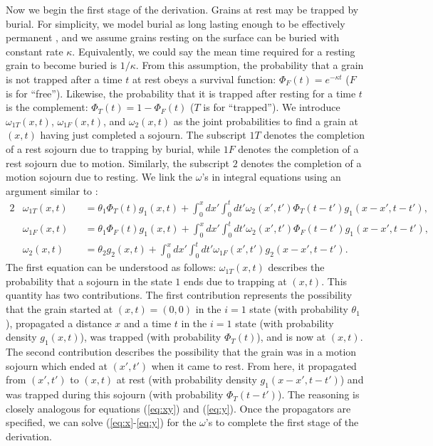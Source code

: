\documentclass[draft,grl]{agujournal2018}
\newcommand\om{\omega}
\begin{document}
Now we begin the first stage of the derivation.
Grains at rest may be trapped by burial.
For simplicity, we model burial as long lasting enough to be effectively permanent \citep[e.g.,][]{Wu2019}, and we assume grains resting on the surface can be buried with constant rate $\kappa$.
Equivalently, we could say the mean time required for a resting grain to become buried is $1/\kappa$.
From this assumption, the probability that a grain is not trapped after a time $t$ at rest obeys a survival function: $\Phi_F(t) = e^{-\kappa t}$ ($F$ is for ``free''). Likewise, the probability that it is trapped after resting for a time $t$ is the complement: $\Phi_T(t) = 1-\Phi_F(t)$ ($T$ is for ``trapped'').
We introduce $\omega_{1T}(x,t)$, $\omega_{1F}(x,t)$, and $\omega_2(x,t)$ as the joint probabilities to find a grain at $(x,t)$ having just completed a sojourn.
The subscript ${1T}$ denotes the completion of a rest sojourn due to trapping by burial, while $1F$ denotes the completion of a rest sojourn due to motion.
Similarly, the subscript $2$ denotes the completion of a motion sojourn due to resting.
We link the $\omega$'s in integral equations using an argument similar to \citet{Weiss1994}:
\begin{alignat}{2}
&\om_{1T}(x,t) &&= \theta_1\Phi_T(t)g_1(x,t) + \int_0^x dx' \int_0^t dt' \om_2(x',t')\Phi_T(t-t')g_1(x-x',t-t')\label{eq:x},\\
&\om_{1F}(x,t) &&= \theta_1\Phi_F(t)g_1(x,t) + \int_0^x dx' \int_0^t dt' \om_2(x',t') \Phi_F(t-t') g_1(x-x',t-t'),\label{eq:xy}\\
&\om_2(x,t) &&= \theta_2 g_2(x,t) + \int_0^x dx' \int_0^t dt' \om_{1F}(x',t')g_2(x-x',t-t'). \label{eq:y}
\end{alignat}
The first equation can be understood as follows: $\omega_{1T}(x,t)$ describes the probability that a sojourn in the state $1$ ends due to trapping at $(x,t)$. This quantity has two contributions. The first contribution represents the possibility that the grain started at $(x,t)=(0,0)$ in the $i=1$ state (with probability $\theta_1$), propagated a distance $x$ and a time $t$ in the $i=1$ state (with probability density $g_1(x,t)$), was trapped (with probability $\Phi_T(t)$), and is now at $(x,t)$. 
The second contribution describes the possibility that the grain was in a motion sojourn which ended at $(x',t')$ when it came to rest. From here, it propagated from $(x',t')$ to $(x,t)$ at rest (with probability density $g_1(x-x',t-t')$) and was trapped during this sojourn (with probability $\Phi_T(t-t')$).
The reasoning is closely analogous for equations (\ref{eq:xy}) and (\ref{eq:y}).
Once the propagators are specified, we can solve (\ref{eq:x}-\ref{eq:y}) for the $\omega$'s to complete the first stage of the derivation.
\end{document}
